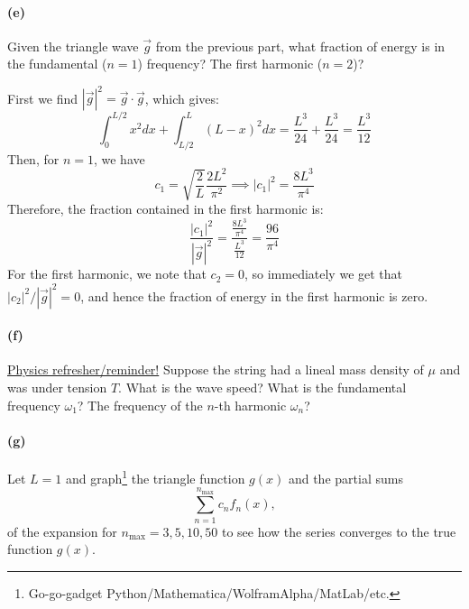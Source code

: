 \documentclass{article}
\begin{document}
\paragraph{(e)} 
Given the triangle wave $\vec{g}$ from the previous part, what fraction of energy is in the fundamental ($n=1$) frequency?  The first harmonic ($n=2$)?

\begin{solution}
    First we find $|\vec g|^2 = \vec g \cdot \vec g$, which gives: 
    \[ \int_0^{L/2} x^2 dx + \int_{L/2}^L (L - x)^2 dx = \frac{L^3}{24} + \frac{L^3}{24} = \frac{L^3}{12}\]
    Then, for $n = 1$, we have 
    \[ c_1 = \sqrt{\frac 2L} \frac{2L^2}{\pi^2} \implies |c_1|^2 = \frac{8L^3}{\pi^4}\]
    Therefore, the fraction contained in the first harmonic is: 
    \[ \frac{|c_1|^2}{|\vec g|^2} = \frac{\frac{8L^3}{\pi^4}}{\frac{L^3}{12}} = \frac{96}{\pi^4}\]
    For the first harmonic, we note that $c_2 = 0$, so immediately we get that $|c_2|^2/|\vec g|^2 = 0$, and hence the fraction of energy in the first harmonic is zero.
\end{solution}


\paragraph{(f)}		\extrapart
\ul{Physics refresher/reminder!}
Suppose the string had a lineal mass density of $\mu$ and was under tension $T$.  What is the wave speed?  What is the fundamental frequency $\omega_{1}$?  
The frequency of the $n$-th harmonic $\omega_{n}$?


\paragraph{(g)}
Let $L=1$ and graph\footnote{Go-go-gadget Python/Mathematica/WolframAlpha/MatLab/etc.} the triangle function $g(x)$ and the 
partial sums
	\begin{equation*}
		\sum_{n=1}^{n_{\textrm{max}}} c_{n}f_{n}(x),
	\end{equation*}
of the expansion for $n_{\textrm{max}} = 3, 5, 10, 50$ to see how the series converges to the true function $g(x)$.
\end{document}
